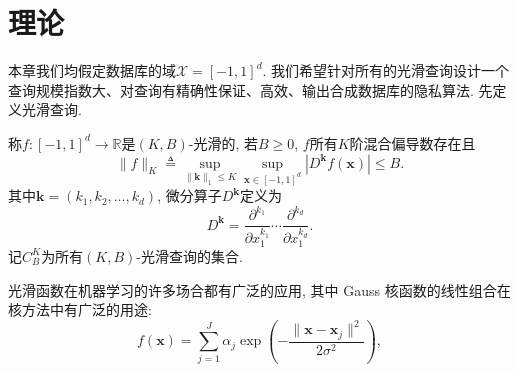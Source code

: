 \chapter{理论} %
\label{cha:理论}
本章我们均假定数据库的域$\mathcal{X} = [-1, 1]^d$. 我们希望针对所有的光滑查询设计一个查询规模指数大、对查询有精确性保证、高效、输出合成数据库的隐私算法. 先定义光滑查询.
\begin{defn}[$(K, B)$-光滑查询]\label{defn:K, B-光滑查询}
  称$f\colon[-1, 1]^d\to\mathbb R$是$(K, B)$-光滑的, 若$B \ge 0$, $f$所有$K$阶混合偏导数存在且
  \[
    \|f\|_K\triangleq \sup_{\|\mathbf{k}\|_1 \le K}\sup_{\mathbf{x}\in[-1, 1]^d} \left|D^{\mathbf{k}}f(\mathbf{x})\right| \le B.
  \]
  其中$\mathbf{k} = (k_1, k_2, \dots, k_d)$, 微分算子$D^{\mathbf{k}}$定义为
  \[
    D^{\mathbf{k}} = \frac{\partial^{k_1}}{\partial x_1^{k_1}}\cdots\frac{\partial^{k_d}}{\partial x_1^{k_d}}.
  \]
  记$C_B^K$为所有$(K, B)$-光滑查询的集合. 
\end{defn}
光滑函数在机器学习的许多场合都有广泛的应用\parencite{van1996weak, wahba1999support, smola1998connection}, 其中 Gauss 核函数的线性组合在核方法中有广泛的用途\parencite{shawe2004kernel, liu2011kernel}:
\begin{equation}\label{eq:Gauss核函数线性组合}
  f(\mathbf{x}) = \sum_{j = 1}^J \alpha_j \exp\left(-\frac{\|\mathbf{x} - \mathbf{x}_j\|^2}{2\sigma^2}\right), 
\end{equation}
  
